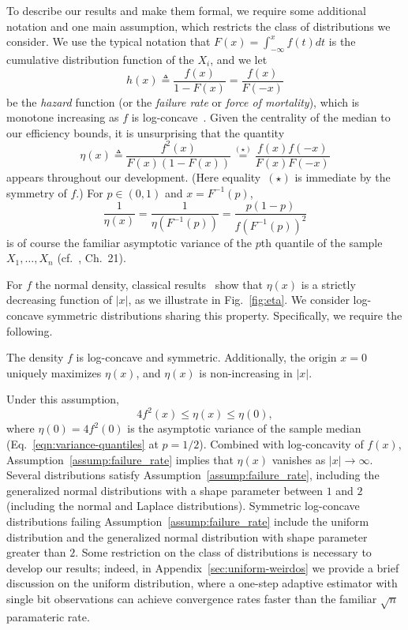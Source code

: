 To describe our results and make them formal, we require some additional
notation and one main assumption, which restricts the class of distributions
we consider.  We use the typical notation that
$F(x) = \int_{-\infty}^x f(t) dt$ is the cumulative distribution function
of the $X_i$, and we let
\begin{equation*}
  h(x) \triangleq \frac{f(x)}{1-F(x)} = \frac{f(x)}{F(-x)}
\end{equation*}
be the \emph{hazard} function (or the \emph{failure rate} or \emph{force of
  mortality}), which is monotone increasing as $f$ is
log-concave~\cite{bagnoli2005log}. Given the centrality of the median
to our efficiency bounds, it is unsurprising that the quantity
\begin{equation}
  \label{eq:eta_def}
  \eta(x) \triangleq \frac{f^2(x)}{F(x)(1-F(x))}
  \stackrel{(\star)}{=} \frac{f(x)f(-x)}{F(x)F(-x)}
\end{equation}
appears throughout our development. (Here equality~$(\star)$ is immediate by
the symmetry of $f$.)  For $p \in (0, 1)$ and $x = F^{-1}(p)$,
\begin{equation}
  \label{eqn:variance-quantiles}
  \frac{1}{\eta(x)} =
  \frac{1}{\eta(F^{-1}(p))}
  = \frac{p (1 - p)}{f(F^{-1}(p))^2}
\end{equation}
is of course the familiar asymptotic variance of the $p$th quantile of the sample $X_1,\ldots,X_n$ (cf.~\cite{VanDerVaart98}, Ch.~21).

For $f$ the normal density, classical results~\cite{Samford1953,
  hammersley1950estimating} show that $\eta(x)$ is a strictly
decreasing function of $|x|$, as we illustrate in Fig.~\ref{fig:eta}.
%
We consider log-concave symmetric distributions sharing this
property.  Specifically, we require the following.
\begin{assumption}
  \label{assump:failure_rate}
  The density $f$ is log-concave and symmetric.  Additionally, the origin $x
  = 0$ uniquely maximizes $\eta(x)$, and $\eta(x)$ is non-increasing in
  $|x|$.
\end{assumption}
Under this assumption,
\begin{equation*}
  4 f^2(x) \leq \eta(x) \leq \eta(0),
\end{equation*} 
%
where $\eta(0) = 4 f^2(0)$ is the asymptotic variance of the sample median
(Eq.~\eqref{eqn:variance-quantiles} at $p = 1/2$).  Combined with
log-concavity of $f(x)$, Assumption~\ref{assump:failure_rate} implies that
$\eta(x)$ vanishes as $|x|\rightarrow \infty$.  Several distributions
satisfy Assumption~\ref{assump:failure_rate}, including the generalized
normal distributions with a shape parameter between $1$ and $2$ (including
the normal and Laplace distributions). Symmetric log-concave distributions
failing Assumption~\ref{assump:failure_rate} include the uniform
distribution and the generalized normal distribution with shape parameter
greater than $2$. Some restriction on the class of distributions is
necessary to develop our results; indeed, in
Appendix~\ref{sec:uniform-weirdos} we provide a brief discussion on the
uniform distribution, where a one-step adaptive estimator with single bit
observations can achieve convergence rates faster than the familiar
$\sqrt{n}$ paramateric rate.

